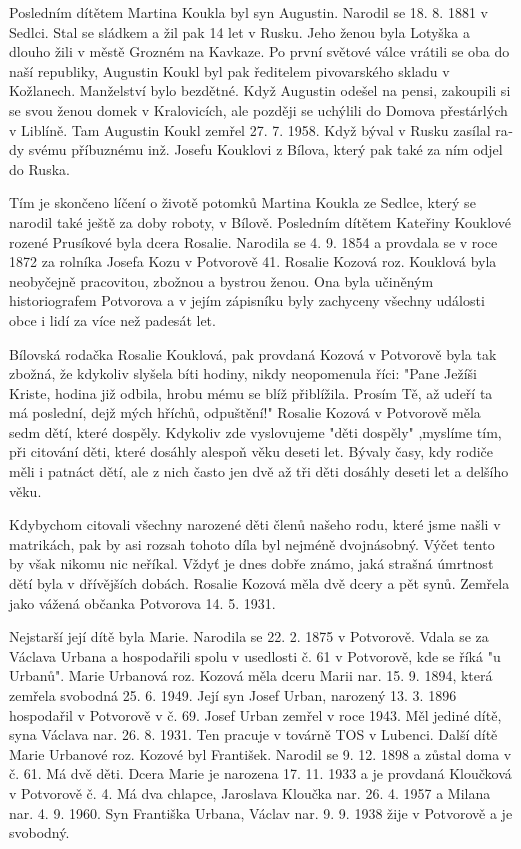 \documentclass[../dejiny-rodu-prusiku.tex]{subfiles}
\begin{document}
Posledním dítětem Martina Koukla byl syn Augustin. Narodil se 18. 8. 1881 v Sedlci. Stal se sládkem a žil pak 14 let v Rusku. Jeho ženou byla Lotyška a dlouho žili v městě Grozném na Kavkaze. Po první světové válce vrá­tili se oba do naší republiky, Augustin Koukl byl pak ředitelem pivovarského skladu v Kožlanech. Manželství bylo bezdětné. Když Augustin odešel na pensi, zakoupi­li si se svou ženou domek v Kralovicích, ale později se uchýlili do Domova přestárlých v Liblíně. Tam Augustin Koukl zemřel 27. 7. 1958. Když býval v Rusku zasílal ra­dy svému příbuznému inž. Josefu Kouklovi z Bílova, kte­rý pak také za ním odjel do Ruska.

Tím je skončeno líčení o životě potomků Martina Koukla ze Sedlce, který se narodil také ještě za doby roboty, v Bílově.
Posledním dítětem Kateřiny Kouklové  rozené Prusíkové byla dcera Rosalie. Narodila se 4. 9. 1854 a provdala se v roce 1872 za rolníka Josefa Kozu v Potvorově 41. Rosalie Kozová roz. Kouklová byla neobyčejně pracovitou, zbožnou a bystrou ženou. Ona byla učiněným historiografem Potvorova a v jejím zápisníku byly zachyceny všechny události obce i lidí za více než padesát let.

Bílovská rodačka Rosalie Kouklová, pak provdaná Kozová v Potvorově byla tak zbožná, že kdykoliv slyšela bíti hodiny, nikdy neopomenula říci: "Pane Ježíši Kriste, hodi­na již odbila, hrobu mému se blíž přiblížila. Prosím Tě, až udeří ta má poslední, dejž mých hříchů, odpuštění!" Rosalie Kozová v Potvorově měla sedm dětí, které dospě­ly. Kdykoliv zde vyslovujeme "děti dospěly" ,myslíme tím, při citování děti, které dosáhly alespoň věku deseti let. Bývaly časy, kdy rodiče měli i patnáct dětí, ale z nich často jen dvě až tři děti dosáhly deseti let a delšího věku.

Kdybychom citovali všechny narozené děti členů našeho rodu, které jsme našli v matrikách, pak by asi rozsah tohoto díla byl nejméně dvojnásobný. Výčet tento by však nikomu nic neříkal. Vždyť je dnes dobře známo, jaká straš­ná úmrtnost dětí byla v dřívějších dobách. Rosalie Kozová měla dvě dcery a pět synů. Zemřela jako vážená občanka Potvorova 14. 5. 1931.

Nejstarší její dítě byla Marie. Narodila se 22. 2. 1875 v Potvorově. Vdala se za Václava Urbana a hospodařili spolu v usedlosti č. 61 v Potvorově, kde se říká "u Ur­banů". Marie Urbanová roz. Kozová měla dceru Marii nar. 15. 9. 1894, která zemřela svobodná 25. 6. 1949. Její syn Josef Urban, narozený 13. 3. 1896 hospodařil v Potvoro­vě v č. 69. Josef Urban zemřel v roce 1943. Měl jediné dítě, syna Václava nar. 26. 8. 1931. Ten pracuje v továrně TOS v Lubenci. Další dítě Marie Urbanové roz. Kozové byl František. Narodil se 9. 12. 1898 a zůstal doma v č. 61. Má dvě děti. Dcera Marie je narozena 17. 11. 1933 a je provdaná Kloučková v Potvorově č. 4. Má dva chlapce, Jarosla­va Kloučka nar. 26. 4. 1957 a Milana nar. 4. 9. 1960. Syn Františka Urbana, Václav nar. 9. 9. 1938 žije v Potvorově a je svobodný.
\end{document}
